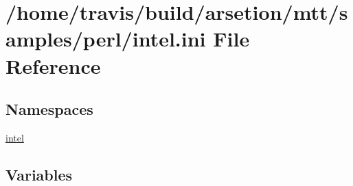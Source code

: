 \hypertarget{intel_8ini}{\section{/home/travis/build/arsetion/mtt/samples/perl/intel.ini File Reference}
\label{intel_8ini}
}
\subsection*{Namespaces}
\begin{DoxyCompactItemize}
\item 
\hyperlink{namespaceintel}{intel}
\end{DoxyCompactItemize}
\subsection*{Variables}
